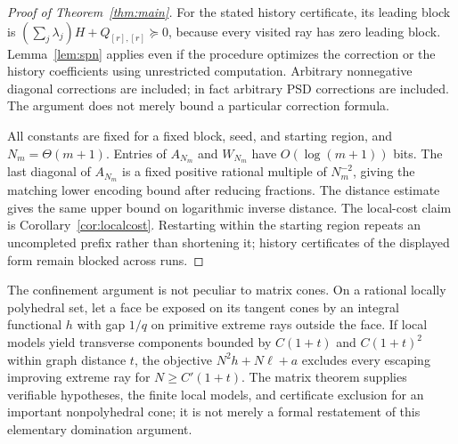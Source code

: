 \begin{proof}[Proof of Theorem~\ref{thm:main}]
For the stated history certificate, its leading block is $(\sum_j\lambda_j)H+Q_{[r],[r]}\succeq0$, because every visited ray has zero leading block. Lemma~\ref{lem:spn} applies even if the procedure optimizes the correction or the history coefficients using unrestricted computation. Arbitrary nonnegative diagonal corrections are included; in fact arbitrary PSD corrections are included. The argument does not merely bound a particular correction formula.

All constants are fixed for a fixed block, seed, and starting region, and $N_m=\Theta(m+1)$. Entries of $A_{N_m}$ and $W_{N_m}$ have $O(\log(m+1))$ bits. The last diagonal of $A_{N_m}$ is a fixed positive rational multiple of $N_m^{-2}$, giving the matching lower encoding bound after reducing fractions. The distance estimate gives the same upper bound on logarithmic inverse distance. The local-cost claim is Corollary~\ref{cor:localcost}. Restarting within the starting region repeats an uncompleted prefix rather than shortening it; history certificates of the displayed form remain blocked across runs.
\end{proof}

\begin{remark}
The confinement argument is not peculiar to matrix cones. On a rational locally polyhedral set, let a face be exposed on its tangent cones by an integral functional $h$ with gap $1/q$ on primitive extreme rays outside the face. If local models yield transverse components bounded by $C(1+t)$ and $C(1+t)^2$ within graph distance $t$, the objective $N^2h+N\ell+a$ excludes every escaping improving extreme ray for $N\ge C'(1+t)$. The matrix theorem supplies verifiable hypotheses, the finite local models, and certificate exclusion for an important nonpolyhedral cone; it is not merely a formal restatement of this elementary domination argument.
\end{remark}
